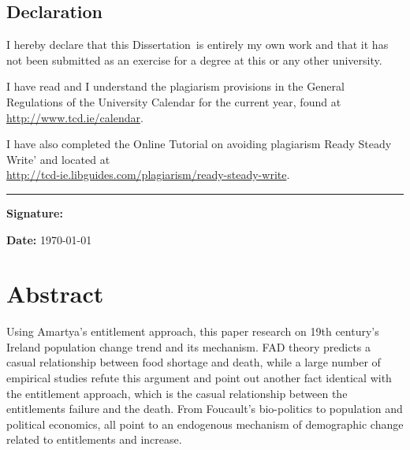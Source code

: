\documentclass[a4paper,oneside,12pt]{book}
\title{\thesistitle}
\author{\authorname}
\newcommand{\typeofthesis}{Dissertation} %
\begin{document}

\doublespacing

\newpage

\section*{Declaration}
I hereby declare that this \typeofthesis\ is entirely my own work and that it has not been submitted as an exercise for a degree at this or any other university.

I have read and I understand the plagiarism provisions in the General Regulations of the University Calendar for the current year, found at\\
 \url{http://www.tcd.ie/calendar}.

I have also completed the Online Tutorial on avoiding plagiarism Ready Steady Write' and located at \\
 \url{http://tcd-ie.libguides.com/plagiarism/ready-steady-write}.

\vspace{.3cm}
\rule{10cm}{.3pt}

\begin{flushleft}
	\begin{minipage}{\linewidth}
		\textbf{Signature:} 
	\end{minipage}
\end{flushleft}
\textbf{Date: } \today
\vspace{.3cm}

\newpage


\chapter{Abstract}

Using Amartya's entitlement approach, this paper research on 19th century's Ireland population change trend and its mechanism. FAD theory predicts a casual relationship between food shortage and death, while a large number of empirical studies refute this argument and point out another fact identical with the entitlement approach, which is the casual relationship between the entitlements failure and the death. From Foucault's bio-politics to population and political economics, all point to an endogenous mechanism of demographic change related to entitlements and increase.
\end{document}

